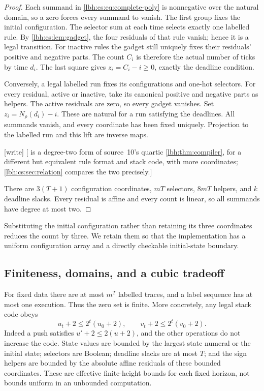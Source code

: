 \documentclass[11pt,letterpaper]{article}
\theoremstyle{definition}
\theoremstyle{remark}
\newcommand{\1}{\mathbf 1}
\newcommand{\wtag}{\textup{[write]}}%
\begin{document}
\begin{proof}
Each summand in \eqref{lbh:cs:eq:complete-poly} is nonnegative over the natural
domain, so a zero forces every summand to vanish. The first group fixes
the initial configuration. The selector sum at each time selects exactly
one labelled rule. By \cref{lbh:cs:lem:gadget}, the four residuals of that rule
vanish; hence it is a legal transition. For inactive rules the gadget
still uniquely fixes their residuals' positive and negative parts.
The count $C_i$ is therefore the actual number of ticks by time $d_i$.
The last square gives $z_i=C_i-i\geq0$, exactly the deadline condition.

Conversely, a legal labelled run fixes its configurations and one-hot
selectors. For every residual, active or inactive, take its canonical
positive and negative parts as helpers. The active residuals are zero,
so every gadget vanishes. Set $z_i=N_\rho(d_i)-i$. These are natural for a
run satisfying the deadlines. All summands vanish, and every coordinate
has been fixed uniquely. Projection to the labelled run and this lift
are inverse maps.
\par\wtag{} [ is a degree-two form of source~10's quartic
\cref{lbh:thm:compiler}, for a different but equivalent rule format and stack code, with more
coordinates; \cref{lbh:cs:sec:relation} compares the two precisely.]\par

There are $3(T+1)$ configuration coordinates, $mT$ selectors, $8mT$
helpers, and $k$ deadline slacks. Every residual is affine and every
count is linear, so all summands have degree at most two.
\end{proof}

Substituting the initial configuration rather than retaining its three
coordinates reduces the count by three. We retain them so that the
implementation has a uniform configuration array and a directly checkable
initial-state boundary.

\subsection{Finiteness, domains, and a cubic tradeoff}
For fixed data there are at most $m^T$ labelled traces, and a label sequence
has at most one execution. Thus the zero set is finite. More concretely,
any legal stack code obeys
\begin{equation}\label{lbh:cs:eq:stack-bound}
 u_t+2\leq 2^t(u_0+2),\qquad v_t+2\leq2^t(v_0+2).
\end{equation}
Indeed a push satisfies $u'+2\leq2(u+2)$, and the other operations do not
increase the code. State values are bounded by the largest state numeral
or the initial state; selectors are Boolean; deadline slacks are at most
$T$; and the sign helpers are bounded by the absolute affine residuals of
these bounded coordinates. These are effective finite-height bounds for
each fixed horizon, not bounds uniform in an unbounded computation.
\end{document}
